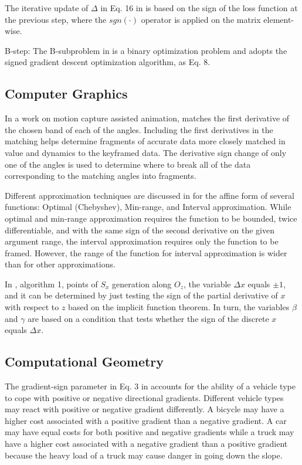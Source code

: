 \documentclass[11pt]{book}
\begin{document}
The iterative update of $\Delta$ in Eq. 16 in \cite{chen2018deep}
is based on the sign of the loss function at the previous step, where
the $sgn(\cdot)$ operator is applied on the matrix element-wise.

B-step: The B-subproblem in \cite{ying2020locality} is a binary optimization
problem and adopts the signed gradient descent optimization algorithm,
as Eq. 8.


\subsection{Computer Graphics}

In a work on motion capture assisted animation, \cite{pullen2002motion} matches the first derivative of the chosen
band of each of the angles. Including the first derivatives in the
matching helps determine fragments of accurate data more closely matched
in value and dynamics to the keyframed data. The derivative sign change
of only one of the angles is used to determine where to break all
of the data corresponding to the matching angles into fragments.

Different approximation techniques are discussed in \cite{fryazinov2010extending}
for the affine form of several functions: Optimal (Chebyshev), Min-range,
and Interval approximation. While optimal and min-range approximation
requires the function to be bounded, twice differentiable, and with
the same sign of the second derivative on the given argument range,
the interval approximation requires only the function to be framed.
However, the range of the function for interval approximation is wider
than for other approximations.

In \cite{namane2018fast}, algorithm 1, \textquotedbl points of $S_{x}$
generation along $O_{z}$\textquotedbl , the variable $\Delta x$
equals $\pm1$, and it can be determined by just testing the sign
of the partial derivative of $x$ with respect to $z$ based on the
implicit function theorem. In turn, the variables $\beta$ and $\gamma$
are based on a condition that tests whether the sign of the discrete
$x$ equals $\Delta x$.


\subsection{Computational Geometry}

The gradient-sign parameter in Eq. 3 in \cite{horng2002vehicle} accounts
for the ability of a vehicle type to cope with positive or negative
directional gradients. Different vehicle types may react with positive
or negative gradient differently. A bicycle may have a higher cost
associated with a positive gradient than a negative gradient. A car
may have equal costs for both positive and negative gradients while
a truck may have a higher cost associated with a negative gradient
than a positive gradient because the heavy load of a truck may cause
danger in going down the slope.
\end{document}
